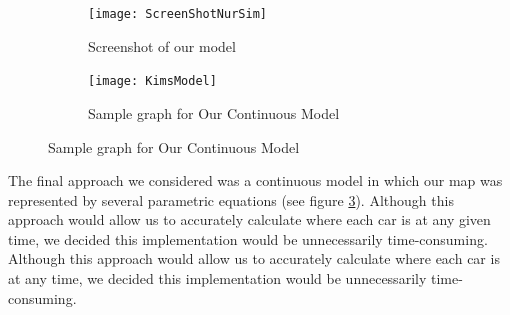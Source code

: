 \documentclass[11pt]{article}
\begin{document}
\begin{figure}
	
	\centering
	\begin{subfigure}{.45\textwidth}
		\centering
		\texttt{[image: ScreenShotNurSim]}
		\caption{Screenshot of  our model }
		\label{NurScreenshot}
	\end{subfigure}
	\begin{subfigure}{.45\textwidth}
		\centering
		\texttt{[image: KimsModel]}
		\caption{Sample graph for Our Continuous Model}
		\label{KimModel}
	\end{subfigure}
\end{figure}	
%		

	The final approach we considered was a continuous model in which our map was represented by several parametric equations (see figure \ref{KimModel}). 
	Although this approach would allow us to accurately calculate where each car is at any given time, we decided this implementation would be unnecessarily time-consuming.  
	Although this approach would allow us to accurately calculate where each car is at any time, we decided this implementation would be unnecessarily time-consuming.  
\end{document}
